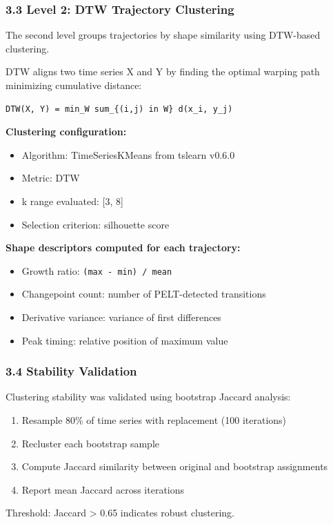 \subsubsection{3.3 Level 2: DTW Trajectory Clustering}

The second level groups trajectories by shape similarity using DTW-based clustering.

DTW aligns two time series X and Y by finding the optimal warping path minimizing cumulative distance:

\begin{verbatim}
DTW(X, Y) = min_W sum_{(i,j) in W} d(x_i, y_j)
\end{verbatim}

\textbf{Clustering configuration:}
\begin{itemize}
\item Algorithm: TimeSeriesKMeans from tslearn v0.6.0
\item Metric: DTW
\item k range evaluated: [3, 8]
\item Selection criterion: silhouette score
\end{itemize}

\textbf{Shape descriptors computed for each trajectory:}
\begin{itemize}
\item Growth ratio: \texttt{(max - min) / mean}
\item Changepoint count: number of PELT-detected transitions
\item Derivative variance: variance of first differences
\item Peak timing: relative position of maximum value
\end{itemize}

\subsubsection{3.4 Stability Validation}

Clustering stability was validated using bootstrap Jaccard analysis:
\begin{enumerate}
\item Resample 80\% of time series with replacement (100 iterations)
\item Recluster each bootstrap sample
\item Compute Jaccard similarity between original and bootstrap assignments
\item Report mean Jaccard across iterations
\end{enumerate}

Threshold: Jaccard > 0.65 indicates robust clustering.
